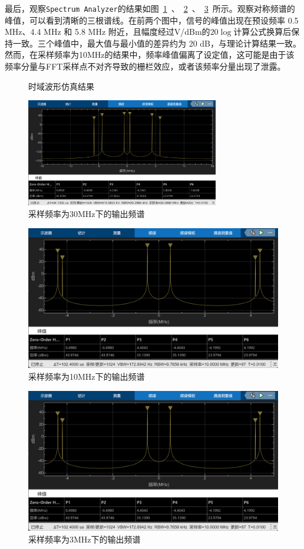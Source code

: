 \documentclass[lang=cn,newtx,10pt,scheme=chinese]{elegantbook}
\begin{document}
最后，观察\lstinline{Spectrum Analyzer}的结果如图~\ref{fig:spectrum30}~、~\ref{fig:spectrum10}~、~\ref{fig:spectrum3}~所示。观察对称频谱的峰值，可以看到清晰的三根谱线。在前两个图中，信号的峰值出现在预设频率 0.5 MHz、4.4 MHz 和 5.8 MHz 附近，且幅度经过V/dBm的$20\log$计算公式换算后保持一致。三个峰值中，最大值与最小值的差异约为 20 dB，与理论计算结果一致。然而，在采样频率为10MHz的结果中，频率峰值偏离了设定值，这可能是由于该频率分量与FFT采样点不对齐导致的栅栏效应，或者该频率分量出现了泄露。  



\begin{figure}[htbp]
    \centering
    \newline
    \caption{时域波形仿真结果}
\end{figure}
\begin{figure}[htbp]
  \centering
  \includegraphics[width=0.75\textwidth]{figure/30M.png}
  \caption{采样频率为30MHz下的输出频谱}
  \label{fig:spectrum30}
\end{figure}
\begin{figure}[htbp]
  \centering
  \includegraphics[width=.75\textwidth]{figure/10M.png}
  \caption{采样频率为10MHz下的输出频谱}
  \label{fig:spectrum10}
\end{figure}
\begin{figure}[htbp]
  \centering
  \includegraphics[width=.75\textwidth]{figure/10M.png}
  \caption{采样频率为3MHz下的输出频谱}
  \label{fig:spectrum3}
\end{figure}
\end{document}
